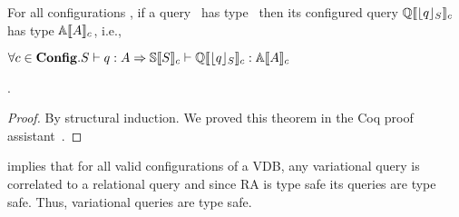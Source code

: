 \begin{theorem}
\label{thm:var-pres}
For all configurations \config, if a query \vQ\ has type \vType\ 
then its configured query \ensuremath{\eeSem {\constrain \vQ}}
has type \ensuremath{\olSem {\vType}}, i.e., \\
\centerline{
\ensuremath{
\forall \config \in \confSet. \envWithoutVctx { \vQ} {\vType} \Rightarrow 
\pEnv [\osSem {\vSch}] {\eeSem {\constrain \vQ}} {\olSem {\vType}}
}}.
\end{theorem}

\begin{proof}
By structural induction. We proved this theorem in the Coq proof assistant~\cite{Khan21}.
\end{proof}


 implies that for all valid configurations of a VDB, any variational
query is correlated to a relational query and since RA is type safe its queries are
type safe. Thus, variational queries are type safe. 

